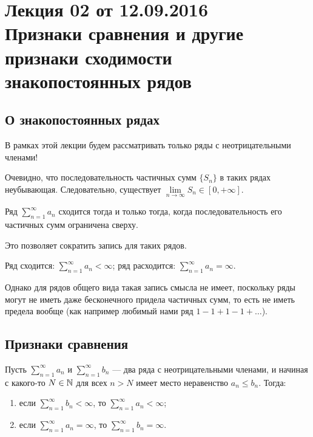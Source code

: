 \pagestyle{fancy}
\section{Лекция 02 от 12.09.2016 \\Признаки сравнения и другие признаки сходимости знакопостоянных рядов}

\subsection{О знакопостоянных рядах}

В рамках этой лекции будем рассматривать только ряды с неотрицательными членами!

Очевидно, что последовательность частичных сумм $\{S_n \}$ в таких рядах неубывающая. Следовательно, существует $\lim\limits_{n\rightarrow \infty}S_n \in [0, +\infty]$.

\begin{Statement}
	Ряд $\sum\limits_{n=1}^{\infty} a_n$ сходится тогда и только тогда, когда последовательность его частичных сумм ограничена сверху.
\end{Statement}

Это позволяет сократить запись для таких рядов.
\begin{Designation} Ряд сходится: $\sum\limits_{n=1}^{\infty} a_n < \infty$; ряд расходится: $\sum\limits_{n=1}^{\infty} a_n = \infty$.
\end{Designation}
Однако для рядов общего вида такая запись смысла не имеет, поскольку ряды могут не иметь даже бесконечного придела частичных сумм, то есть не иметь предела вообще (как например любимый нами ряд $1 - 1 + 1 - 1 + \ldots$).


\subsection{Признаки сравнения}

\begin{Test}
	Пусть $\sum\limits_{n=1}^{\infty} a_n$ и $\sum\limits_{n=1}^{\infty} b_n$ --- два ряда с неотрицательными членами, и начиная с какого-то $N\in \mathbb{N}$ для всех $n > N$ имеет место неравенство $a_n \le b_n$. Тогда:
	\begin{enumerate}
	\item если $\sum\limits_{n=1}^{\infty} b_n < \infty$, то $\sum\limits_{n=1}^{\infty} a_n < \infty$;
	\item если $\sum\limits_{n=1}^{\infty} a_n = \infty$, то $\sum\limits_{n=1}^{\infty} b_n = \infty$.
	\end{enumerate}
\end{Test}

